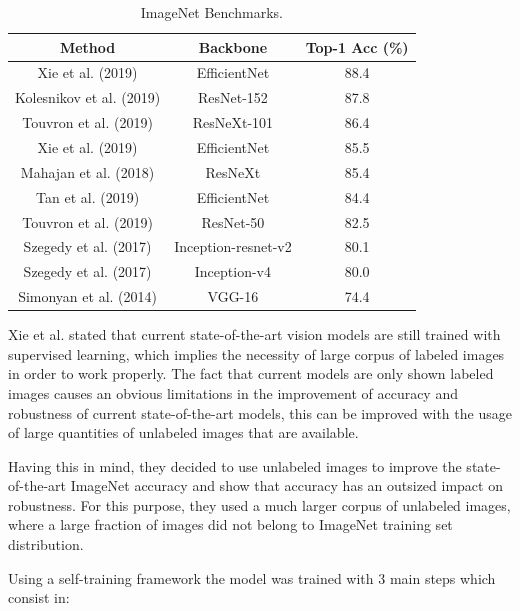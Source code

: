 \begin{table}[htb]
    
    \centering
    \caption {ImageNet Benchmarks.}
    \begin{tabular}{|| c | c | c ||} 
    \hline
    Method & Backbone & Top-1 Acc (\%)  \\ [0.5ex] 
    \hline\hline
    Xie et al. (2019) \cite{Xie2019}& EfficientNet & 88.4
    \\ 
    \hline
    Kolesnikov et al. (2019) \cite{alex2019large} & ResNet-152 & 87.8

    \\
    \hline
    Touvron et al. (2019) \cite{touvron2019fixing} & ResNeXt-101 & 86.4

    \\
    \hline
    Xie et al. (2019) \cite{xie2019adversarial} & EfficientNet & 85.5

    \\ [1ex] 
    \hline
    Mahajan et al. (2018) \cite{Mahajan2018} & ResNeXt & 85.4

    \\ [1ex]
    \hline
    Tan et al. (2019) \cite{tan2019efficientnet}& EfficientNet & 84.4

    \\ [1ex]
    \hline
    Touvron et al. (2019) \cite{touvron2019fixing} & ResNet-50 & 82.5

    \\ [1ex]
    \hline
    Szegedy et al. (2017) \cite{szegedy2016inceptionv4} & Inception-resnet-v2 & 80.1

    \\ [1ex]
    \hline
    Szegedy et al. (2017) \cite{szegedy2016inceptionv4}  & Inception-v4 & 80.0

    \\ [1ex]
    \hline
    Simonyan et al. (2014) \cite{simonyan2014deep} & VGG-16 & 74.4
    \\ [1ex]
    \hline
   \end{tabular}
   \label{table:imagenettable}
\end{table}



\par Xie et al. \cite{Xie2019} stated that current state-of-the-art vision models are still trained with supervised learning, which implies the necessity of large corpus of labeled images in order to work properly. The fact that current models are only shown labeled images causes an obvious limitations in the improvement of accuracy and robustness of current state-of-the-art models, this can be improved with the usage of large quantities of unlabeled images that are available.
\par Having this in mind, they decided to use unlabeled images to improve the state-of-the-art ImageNet accuracy and show that accuracy has an outsized impact on robustness. For this purpose, they used a much larger corpus of unlabeled images, where a large fraction of images did not belong to ImageNet training set distribution.
\par Using a self-training framework the model was trained with 3 main steps which consist in:

